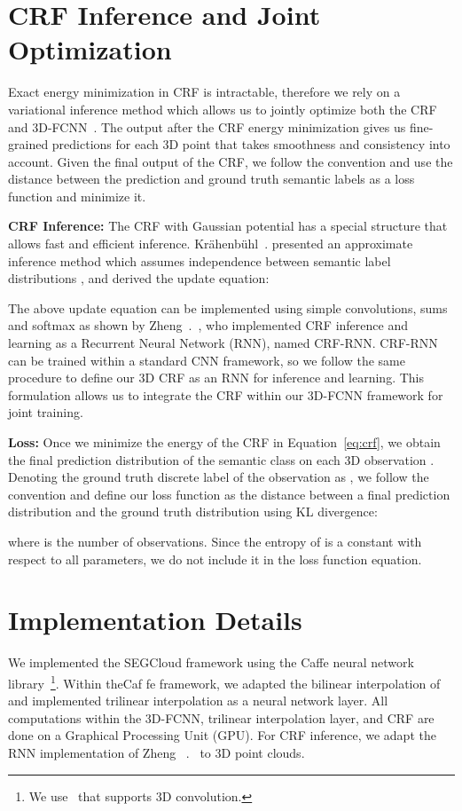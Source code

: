 \documentclass[10pt,twocolumn,letterpaper]{article}
\newcommand{\fccrf}[0]{CRF\xspace}
\newcommand{\ours}[0]{SEGCloud\xspace}
\newcommand{\threedfcnn}[0]{3D-FCNN\xspace}
\begin{document}
\section{\fccrf Inference and Joint Optimization} \label{sec:joint}
Exact energy minimization in \fccrf is intractable, therefore we rely on a variational inference method which allows us to jointly optimize both the \fccrf and \threedfcnn~\cite{Zheng2015,denseCRF}. The output after the \fccrf energy minimization gives us fine-grained predictions for each 3D point that takes smoothness and consistency into account. Given the final output of the \fccrf, we follow the convention and use the distance between the prediction and ground truth semantic labels as a loss function and minimize it.


\noindent\textbf{\fccrf Inference:} \label{sec:inference}
The \fccrf with Gaussian potential has a special structure that allows fast and efficient inference.  Kr\"{a}henb\"{u}hl~\etal. \cite{denseCRF} presented an approximate inference method which assumes independence between semantic label distributions , and derived the update equation:
\vspace{-2mm}


The above update equation can be implemented using simple convolutions, sums and softmax as shown by Zheng~\etal.~\cite{Zheng2015}, who implemented CRF inference and learning as a Recurrent Neural Network (RNN), named CRF-RNN. CRF-RNN can be trained within a standard CNN framework, so we follow the same procedure to define our 3D \fccrf as an RNN for inference and learning. This formulation allows us to integrate the \fccrf within our \threedfcnn framework for joint training.

\noindent\textbf{Loss:} \label{sec:loss}
Once we minimize the energy of the \fccrf in Equation~\ref{eq:crf}, we obtain the final prediction distribution of the semantic class  on each 3D observation . Denoting the ground truth discrete label of the observation  as , we follow the convention and define our loss function as the distance between a final prediction distribution and the ground truth distribution using KL divergence:



where  is the number of observations. Since the entropy of  is a constant with respect to all parameters, we do not include it in the loss function equation. 
\section{Implementation Details} \label{sec:implementation}
We implemented the \ours framework using the Caffe neural network library~\cite{jia2014caffe}\footnote{We use~\cite{video-caffe} that supports 3D convolution.}. Within theCaf fe framework, we adapted the bilinear interpolation of \cite{bilinear} and implemented trilinear interpolation as a neural network layer. All computations within the \threedfcnn, trilinear interpolation layer, and \fccrf are done on a Graphical Processing Unit (GPU). For \fccrf inference, we adapt the RNN implementation of Zheng ~\etal.~\cite{Zheng2015} to 3D point clouds.
\end{document}
